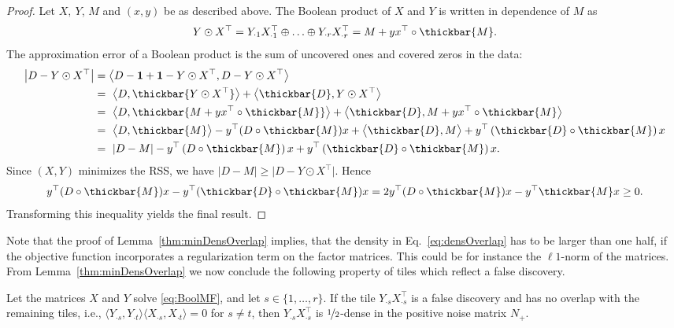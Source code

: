 %
\begin{proof}
Let $X,\ Y$, $M$ and $(x,y)$ be as described above. The Boolean product of $X$ and $Y$ is written in dependence of $M$ as  
\begin{equation*}
Y\odot X^\top= Y_{\cdot 1}X_{\cdot 1}^\top\oplus\ldots\oplus Y_{\cdot r}X_{\cdot r}^\top = M + yx^\top \circ \thickbar{M}.
\end{equation*}
The approximation error of a Boolean product is the sum of uncovered ones and covered zeros in the data: 
\begin{align*}
\bigl\lvert D-Y\odot X^\top \bigr\rvert  
&=\bigl\langle D-\mathbf{1}+\mathbf{1}-Y\odot X^\top,D-Y\odot X^\top\bigr\rangle\\
&=\ \bigl\langle D,\thickbar{Y\odot X^\top }\bigr\rangle +\bigl\langle\thickbar{D},Y\odot X^\top \bigr\rangle\\
&=\ \bigl\langle D,\thickbar{M+ yx^\top \circ \thickbar{M}}\bigr\rangle +\bigl\langle\thickbar{D},M+ yx^\top \circ \thickbar{M}\bigr\rangle\\
&=\ \bigl\langle D,\thickbar{M}\bigr\rangle - y^\top (D\circ \thickbar{M})x +\bigl\langle\thickbar{D},M\bigr\rangle + y^\top \left(\thickbar{D}\circ \thickbar{M}\right)x\\
&=\ \lvert D-M\rvert  - y^\top \left(D\circ \thickbar{M}\right)x + y^\top \left(\thickbar{D}\circ \thickbar{M}\right)x.
\end{align*}
Since $(X,Y)$ minimizes the RSS, we have $\lvert D-M\rvert\geq \bigl\lvert D-Y\odot X^\top\bigr\rvert $. Hence
\begin{equation*}
 y^\top (D\circ \thickbar{M})x - y^\top (\thickbar{D}\circ\thickbar{M})x= 2y^\top (D\circ \thickbar{M})x - y^\top \thickbar{M}x \geq 0.
\end{equation*}
Transforming this inequality yields the final result.
\end{proof}
%
Note that the proof of Lemma~\ref{thm:minDensOverlap} implies, that the density in Eq.~\eqref{eq:densOverlap} has to be larger than one half, if the objective function incorporates a regularization term on the factor matrices. This could be for instance the $\ell1$-norm of the matrices. From Lemma~\ref{thm:minDensOverlap} we now conclude the following property of tiles which reflect a false discovery.  
\begin{corollary}
Let the matrices $X$ and $Y$ solve \eqref{eq:BoolMF}, and let $s\in\{1,\ldots,r\}$. If the tile $Y_{\cdot s}X_{\cdot s}^\top$ is a false discovery and has no overlap with the remaining tiles, i.e., $\langle Y_{\cdot s}, Y_{\cdot t}\rangle\langle X_{\cdot s}, X_{\cdot t}\rangle=0$ for $s\neq t$, then $Y_{\cdot s}X_{\cdot s}^\top$ is $\nicefrac{1}{2}$-dense in the positive noise matrix $N_+$.
\end{corollary}
